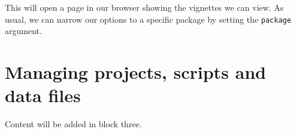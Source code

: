 \documentclass[
]{book}
\begin{document}
This will open a page in our browser showing the vignettes we can view. As usual, we can narrow our options to a specific package by setting the \texttt{package} argument.

\hypertarget{project-scripts-data}{%
\chapter{Managing projects, scripts and data files}\label{project-scripts-data}}

Content will be added in block three.

  
\end{document}
